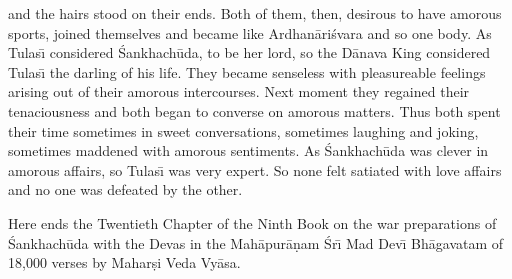 and the hairs stood on their ends. Both of them, then, desirous to have amorous sports, joined themselves and became like Ardhan\=ari\'svara and so one body. As Tulas\={\i} considered \'Sankhach\=uda, to be her lord, so the D\=anava King considered Tulas\={\i} the darling of his life. They became senseless with pleasureable feelings arising out of their amorous intercourses. Next moment they regained their tenaciousness and both began to converse on amorous matters. Thus both spent their time sometimes in sweet conversations, sometimes laughing and joking, sometimes maddened with amorous sentiments. As \'Sankhach\=uda was clever in amorous affairs, so Tulas\={\i} was very expert. So none felt satiated with love affairs and no one was defeated by the other.

Here ends the Twentieth Chapter of the Ninth Book on the war preparations of \'Sankhach\=uda with the Devas in the Mah\=apur\=a\d{n}am \'Sr\={\i} Mad Dev\={\i} Bh\=agavatam of 18,000 verses by Mahar\d{s}i Veda Vy\=asa.



